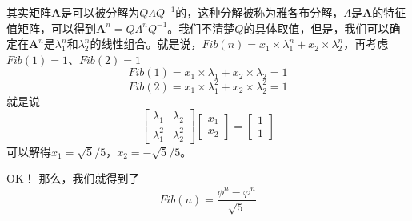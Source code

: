 \documentclass{article}
\begin{document}
\begin{CJK}{UTF8}{gkai}
其实矩阵$\mathbf{A}$是可以被分解为$Q\Lambda Q^{-1}$的，这种分解被称为雅各布分解，$\Lambda$是$\mathbf{A}$的特征值矩阵，可以得到$\mathbf{A}^{n}=Q\Lambda^{n}Q^{-1}$。我们不清楚$Q$的具体取值，但是，我们可以确定在$\mathbf{A}^{n}$是$\lambda_1^{n}$和$\lambda_2^{n}$的线性组合。就是说，$Fib(n) = x_1 \times \lambda_1^{n} + x_2 \times \lambda_2^{n}$，再考虑$Fib(1)=1$、$Fib(2)=1$
\[Fib(1) = x_1 \times \lambda_1 + x_2 \times \lambda_2 = 1\]
\[Fib(2) = x_1 \times \lambda_1^{2} + x_2 \times \lambda_2^{2} = 1\]
就是说
\[
\begin{bmatrix} \lambda_1 & \lambda_2 \\ \lambda_1^2 & \lambda_2^2\end{bmatrix}\begin{bmatrix} x_1 \\ x_2 \end{bmatrix} = \begin{bmatrix} 1 \\ 1 \end{bmatrix}
\]
可以解得$x_1=\sqrt{5}/5$，$x_2=-\sqrt{5}/5$。

OK！ 那么，我们就得到了\[Fib(n)=\frac{\phi^{n}-\varphi^{n}}{\sqrt{5}}\]
\end{CJK}
\end{document}
